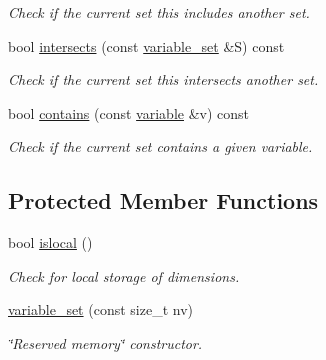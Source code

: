 \begin{DoxyCompactItemize}
\begin{DoxyCompactList}\small\item\em Check if the current set {\itshape this} includes another set. \end{DoxyCompactList}\item 
\hypertarget{classmerlin_1_1variable__set_a7ece5091c9e5a06d983b371b1a39059e}{}bool \hyperlink{classmerlin_1_1variable__set_a7ece5091c9e5a06d983b371b1a39059e}{intersects} (const \hyperlink{classmerlin_1_1variable__set}{variable\+\_\+set} \&S) const \label{classmerlin_1_1variable__set_a7ece5091c9e5a06d983b371b1a39059e}

\begin{DoxyCompactList}\small\item\em Check if the current set {\itshape this} intersects another set. \end{DoxyCompactList}\item 
\hypertarget{classmerlin_1_1variable__set_a915edc4be067c812121f3d684713637a}{}bool \hyperlink{classmerlin_1_1variable__set_a915edc4be067c812121f3d684713637a}{contains} (const \hyperlink{classmerlin_1_1variable}{variable} \&v) const \label{classmerlin_1_1variable__set_a915edc4be067c812121f3d684713637a}

\begin{DoxyCompactList}\small\item\em Check if the current set contains a given variable. \end{DoxyCompactList}\end{DoxyCompactItemize}
\subsection*{Protected Member Functions}
\begin{DoxyCompactItemize}
\item 
\hypertarget{classmerlin_1_1variable__set_ab1576b3d4c9033f7b79c173a73873d81}{}bool \hyperlink{classmerlin_1_1variable__set_ab1576b3d4c9033f7b79c173a73873d81}{islocal} ()\label{classmerlin_1_1variable__set_ab1576b3d4c9033f7b79c173a73873d81}

\begin{DoxyCompactList}\small\item\em Check for local storage of dimensions. \end{DoxyCompactList}\item 
\hypertarget{classmerlin_1_1variable__set_af20fada0cc25d46f952679d59ba8cb26}{}\hyperlink{classmerlin_1_1variable__set_af20fada0cc25d46f952679d59ba8cb26}{variable\+\_\+set} (const size\+\_\+t nv)\label{classmerlin_1_1variable__set_af20fada0cc25d46f952679d59ba8cb26}

\begin{DoxyCompactList}\small\item\em \char`\"{}\+Reserved memory\char`\"{} constructor. \end{DoxyCompactList}\end{DoxyCompactItemize}
